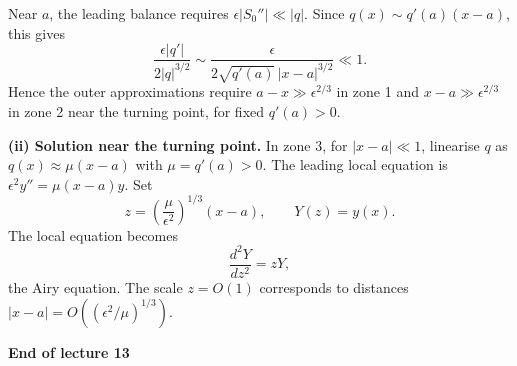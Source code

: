 \documentclass[11pt,a4paper]{article}
\begin{document}
\noindent Near $a$, the leading balance requires
$\epsilon|S_0''|\ll |q|$. Since $q(x)\sim q'(a)(x-a)$, this gives
\[
    \frac{\epsilon|q'|}{2|q|^{3/2}}
    \sim \frac{\epsilon}{2\sqrt{q'(a)}\,|x-a|^{3/2}}\ll1.
\]
Hence the outer approximations require $a-x\gg\epsilon^{2/3}$
in zone 1 and $x-a\gg\epsilon^{2/3}$ in zone 2 near the turning point,
for fixed $q'(a)>0$.

\medskip
\noindent\textbf{(ii) Solution near the turning point.}
In zone 3, for $|x-a|\ll1$, linearise $q$ as
$q(x)\approx\mu(x-a)$ with $\mu=q'(a)>0$. The leading local
equation is $\epsilon^2y''=\mu(x-a)y$. Set
\[
    z=\left(\frac{\mu}{\epsilon^2}\right)^{1/3}(x-a),
    \qquad Y(z)=y(x).
\]
The local equation becomes
\[
    \frac{d^2Y}{dz^2}=zY,
\]
the Airy equation. The scale $z=O(1)$ corresponds to distances
$|x-a|=O((\epsilon^2/\mu)^{1/3})$.

\begin{center}
    \textbf{End of lecture 13}
\end{center}
\end{document}

